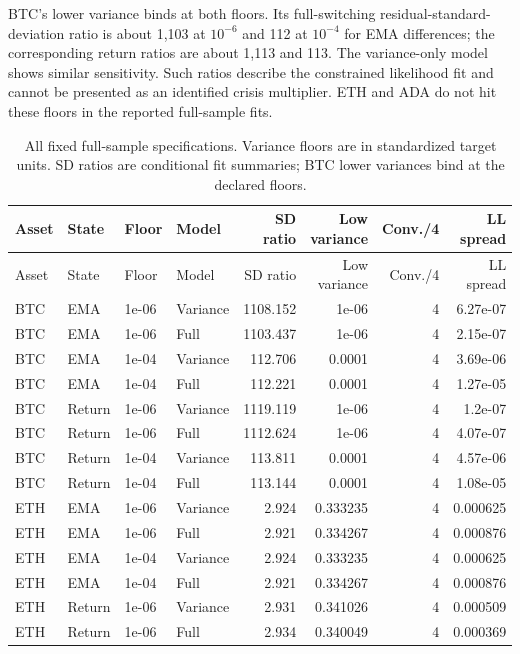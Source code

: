 \documentclass[11pt]{article}
\begin{document}
BTC's lower variance binds at both floors. Its full-switching residual-standard-deviation ratio is about 1,103 at $10^{-6}$ and 112 at $10^{-4}$ for EMA differences; the corresponding return ratios are about 1,113 and 113. The variance-only model shows similar sensitivity. Such ratios describe the constrained likelihood fit and cannot be presented as an identified crisis multiplier. ETH and ADA do not hit these floors in the reported full-sample fits.

{\footnotesize
\begin{longtable}{llllrrrr}
\caption{All fixed full-sample specifications. Variance floors are in standardized target units. SD ratios are conditional fit summaries; BTC lower variances bind at the declared floors.}\label{tab:regime_floor_sensitivity}\\
\toprule Asset & State & Floor & Model & SD ratio & Low variance & Conv./4 & LL spread\\\midrule\endfirsthead
\toprule Asset & State & Floor & Model & SD ratio & Low variance & Conv./4 & LL spread\\\midrule\endhead
\bottomrule\endfoot
BTC & EMA & 1e-06 & Variance & 1108.152 & 1e-06 & 4 & 6.27e-07\\
BTC & EMA & 1e-06 & Full & 1103.437 & 1e-06 & 4 & 2.15e-07\\
BTC & EMA & 1e-04 & Variance & 112.706 & 0.0001 & 4 & 3.69e-06\\
BTC & EMA & 1e-04 & Full & 112.221 & 0.0001 & 4 & 1.27e-05\\
BTC & Return & 1e-06 & Variance & 1119.119 & 1e-06 & 4 & 1.2e-07\\
BTC & Return & 1e-06 & Full & 1112.624 & 1e-06 & 4 & 4.07e-07\\
BTC & Return & 1e-04 & Variance & 113.811 & 0.0001 & 4 & 4.57e-06\\
BTC & Return & 1e-04 & Full & 113.144 & 0.0001 & 4 & 1.08e-05\\
ETH & EMA & 1e-06 & Variance & 2.924 & 0.333235 & 4 & 0.000625\\
ETH & EMA & 1e-06 & Full & 2.921 & 0.334267 & 4 & 0.000876\\
ETH & EMA & 1e-04 & Variance & 2.924 & 0.333235 & 4 & 0.000625\\
ETH & EMA & 1e-04 & Full & 2.921 & 0.334267 & 4 & 0.000876\\
ETH & Return & 1e-06 & Variance & 2.931 & 0.341026 & 4 & 0.000509\\
ETH & Return & 1e-06 & Full & 2.934 & 0.340049 & 4 & 0.000369\\

\end{longtable}}
\end{document}
